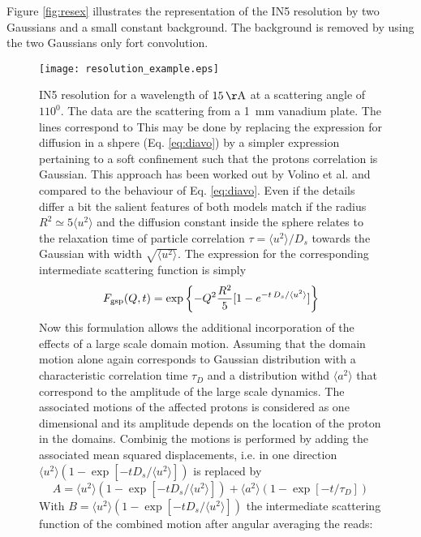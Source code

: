 \documentclass[12pt]{article}
\begin{document}
{Figure \ref{fig:resex} illustrates the representation of the IN5 resolution by two
Gaussians and a small constant background. The background is removed by using the
two Gaussians only fort convolution.
\begin{figure}[ht]
	\centering
  \texttt{[image: resolution\_example.eps]}
	\caption{IN5 resolution for a wavelength of $15\,{\rm \AA}$ at a scattering angle of $110^0$.
                 The data are the scattering from a 1~mm vanadium plate. The lines correspond to 
       This may be done by replacing the expression for diffusion in a shpere (Eq. \ref{eq:diavo}) by a 
simpler expression pertaining to a soft confinement such that the protons correlation is Gaussian.
This approach has been worked out by Volino et al. \cite{volino06vo} and compared to the behaviour
of Eq. \ref{eq:diavo}. Even if the details differ a bit the salient features of both models match
if the radius $R^2\simeq 5 \langle u^2 \rangle $ and the diffusion constant inside the sphere
relates to the relaxation time of particle correlation $\tau = \langle u^2 \rangle / D_s$ 
towards the Gaussian with width $\sqrt{\langle u^2 \rangle}$.
The expression for the corresponding intermediate scattering function is simply
\begin{equation}
\label{eq:gsp}
F_{\rm gsp}(Q,t) = \exp\left \{ -Q^2 \frac{R^2}{5}[1-e^{-t\, D_s/\langle u^2 \rangle}] \right \}
\end{equation}     
%
Now this formulation allows the additional incorporation of the effects of a large scale domain
motion. Assuming that the domain motion alone again corresponds to Gaussian distribution with
a characteristic correlation time $\tau_D$ and a distribution withd $\langle a^2 \rangle$ that correspond to
the amplitude of the large scale dynamics. The associated motions of the affected protons 
is considered as one dimensional and its amplitude depends on the location of the proton in
the domains. Combinig the motions is performed by adding the associated mean squared displacements,
i.e. in one direction $\langle u^2 \rangle (1-\exp [-t D_s /\langle u^2 \rangle ])$ is replaced by
\begin{equation}
\label{eq:ado}
A = \langle u^2 \rangle (1-\exp[-t D_s /\langle u^2 \rangle]) + \langle a^2 \rangle (1-\exp[-t/\tau_D])
\end{equation}
With $B= \langle u^2 \rangle (1-\exp[-t D_s /\langle u^2 \rangle])$ the intermediate scattering
function of the combined motion after angular averaging the reads:
}
\end{figure}}
\end{document}
